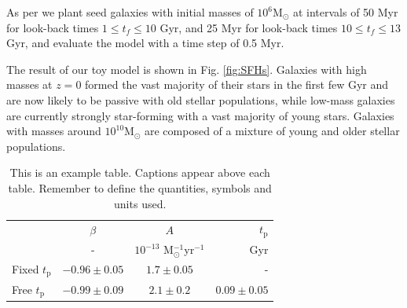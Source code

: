 \documentclass[fleqn,usenatbib]{mnras}
\begin{document}
As per \citet{Childress2014} we plant seed galaxies with initial masses of $10^6 \mathrm{M}_{\odot}$ at intervals of 50 Myr for look-back times $1 \leq t_f \leq 10$ Gyr, and 25 Myr for look-back times $10 \leq t_f \leq 13$ Gyr, and evaluate the model with a time step of 0.5 Myr.

The result of our toy model is shown in Fig. \ref{fig:SFHs}. Galaxies with high masses at $z=0$ formed the vast majority of their stars in the first few Gyr and are now likely to be passive with old stellar populations, while low-mass galaxies are currently strongly star-forming with a vast majority of young stars. Galaxies with masses around $10^{10} \mathrm{M}_{\odot}$ are composed of a mixture of young and older stellar populations.


\begin{table}
	\centering
	\caption{This is an example table. Captions appear above each table.
	Remember to define the quantities, symbols and units used.}
	\label{tab:dtd_results}
	\begin{tabular}{lccr} %
		\hline
		 &$\beta$ & $A$ & $t_{\mathrm{p}}$\\
		 &-       & $10^{-13}$ M$_{\odot}^{-1}$yr$^{-1}$ & Gyr \\
		\hline
		Fixed $t_{\mathrm{p}}$ & $-0.96\pm 0.05$ &  $1.7 \pm 0.05$ & -\\
		Free $t_{\mathrm{p}}$ & $-0.99 \pm 0.09$ & $2.1 \pm 0.2$ & $0.09 \pm 0.05$\\
		\hline
	\end{tabular}
\end{table}
\end{document}
